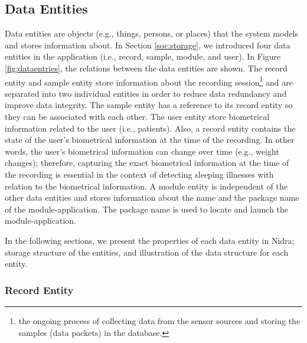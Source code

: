 \subsection{Data Entities}\label{des:dataentity}
Data entities are objects (e.g., things, persons, or places) that the system models and stores information about. In Section \ref{soc:storage}, we introduced four data entities in the application (i.e., record, sample, module, and user). In Figure \ref{fig:dataentries}, the relations between the data entities are shown. The record entity and sample entity store information about the recording session\footnote{the ongoing process of collecting data from the sensor sources and storing the samples (data packets) in the database.} and are separated into two individual entities in order to reduce data redundancy and improve data integrity. The sample entity has a reference to its record entity so they can be associated with each other. The user entity store biometrical information related to the user (i.e., patients). Also, a record entity contains the state of the user's biometrical information at the time of the recording. In other words, the user's biometrical information can change over time (e.g.,  weight changes); therefore, capturing the exact biometrical information at the time of the recording is essential in the context of detecting sleeping illnesses with relation to the biometrical information.  A module entity is independent of the other data entities and stores information about the name and the package name of the module-application. The package name is used to locate and launch the module-application. 

In the following sections, we present the properties of each data entity in Nidra; storage structure of the entities, and illustration of the data structure for each entity.  



\subsubsection{Record Entity} \label{ssec:record}

